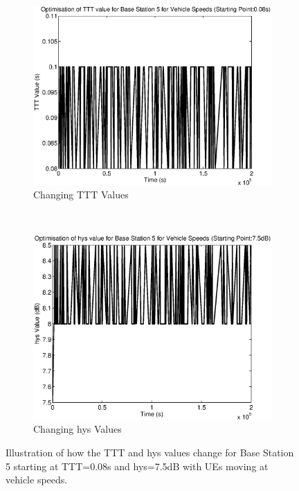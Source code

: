 \begin{figure}[H]
        \centering
        \begin{subfigure}[b]{0.49\textwidth}
                \includegraphics[width=\textwidth]{figures/graphs/vehhighhys/TTT5.eps}
                \caption{Changing TTT Values}
        \end{subfigure}%
        ~ %
        \begin{subfigure}[b]{0.49\textwidth}
                \includegraphics[width=\textwidth]{figures/graphs/vehhighhys/hys5.eps}
                \caption{Changing hys Values}
        \end{subfigure}
        \caption{Illustration of how the TTT and hys values change for Base Station 5 starting at TTT=0.08s and hys=7.5dB with UEs moving at vehicle speeds.}
\end{figure}
